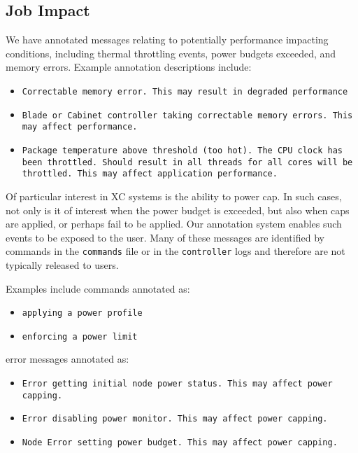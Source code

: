\subsection{Job Impact}
\label{s:jobimpact}

We have annotated messages relating to potentially performance impacting conditions, including
thermal throttling events, power budgets exceeded, and memory errors. Example annotation
descriptions  include:
\begin{itemize}
\item \scriptsize\texttt{Correctable memory error.  This may result in degraded performance}\normalsize
\item \scriptsize\texttt{Blade or Cabinet controller taking correctable memory errors. This may affect performance.}\normalsize
\item \scriptsize\texttt{Package temperature above threshold (too hot). The CPU clock has been throttled. Should result in all threads for all cores will be throttled. This may affect application performance.}\normalsize
\end{itemize}

Of particular interest in XC systems is the ability to power cap. In such cases, not only is it of interest when
the power budget is exceeded, but also when caps are applied, or perhaps fail to be applied. Our annotation
system enables such events to be exposed to the user.
Many of these messages are identified by commands in the \texttt{commands} file or in the \texttt{controller} logs
and therefore are not typically released to users.

Examples include commands annotated as:
\begin{itemize}
\item \scriptsize\texttt{applying a power profile}\normalsize
\item \scriptsize\texttt{enforcing a power limit}\normalsize
\end{itemize}
error messages annotated as:
\begin{itemize}
\item \scriptsize\texttt{Error getting initial node power status. This may affect power capping.}\normalsize
\item \scriptsize\texttt{Error disabling power monitor. This may affect power capping.}\normalsize
\item \scriptsize\texttt{Node Error setting power budget. This may affect power capping.}\normalsize
\end{itemize}

